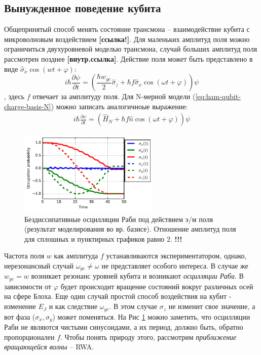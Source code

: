\documentclass[12pt, twoside]{report}
\numberwithin{equation}{section}
\numberwithin{figure}{section}
\begin{document}
\subsection{Вынужденное поведение кубита}
Общепринятый способ менять состояние трансмона -- взаимодействие кубита с микроволновым воздействием \textbf{[ссылка!]}. Для маленьких амплитуд поля можно ограничиться двухуровневой моделью трансмона, случай больших амплитуд поля рассмотрен позднее \textbf{[внутр.ссылка]}. Действие поля может быть представлено в виде $\hat{\sigma}_x \cos (w t + \varphi)$:
\begin{equation}
i \hbar \frac{\partial \psi}{\partial t} =  \left( \frac{\hbar w_{ge}}{2} \hat{\sigma}_z +\hbar f \hat{\sigma}_x \cos \left(\omega t + \varphi\right) \right) \psi
\label{eq:ham-qubit-2d-field}
\end{equation}
, здесь $f$ отвечает за амплитуду поля. Для N-мерной модели (\ref{eq:ham-qubit-charge-basis-N}) можно записать аналогичноые выражение:
\begin{gather}
i \hbar \frac{\partial \psi}{\partial t} = \left( \hat{H}_N + \hbar f \hat{n} \cos \left(\omega t + \varphi \right) \right) \psi
\label{eq:ham-qubit-Nd-field}
\end{gather}
\begin{figure}
\includegraphics[width=0.6\textwidth ]{Pictures2/simple-pulse-2f}
\caption{Бездиссипативные осцилляции Раби под действием э/м поля (результат моделирования во вр. базисе). Отношение амплитуд поля для сплошных и пунктирных графиков равно $2$. \textbf{!!!}}
\label{fig:simple-pulse-2f}
\end{figure}
Частота поля $w$ как амплитуда $f$ устанавливаются экспериментатором, однако, нерезонансный случай $\omega_{ge} \neq \omega$ не представляет особого интереса. В случае же $w_{ge} = w$ возникает резонанс уровней кубита и возникают \textit{осцилляции Раби}. В зависимости от $\varphi$ будет происходит вращение состояний вокруг различных осей на сфере Блоха.
Еще один случай простой способ воздействия на кубит - изменение $E_J$ и как следствие $\omega_{ge}$. В этом случае $\sigma_z$ не изменит свое значение, а вот фаза ($\sigma_x, \sigma_y$) может поменяться. На Рис \ref{fig:simple-pulse-2f} можно заметить, что осцилляции Раби не являются чистыми синусоидами, а их период, должно быть, обратно пропорционален $f$. Чтобы понять природу этого, рассмотрим \textit{приближение вращающейся волны} -- RWA.
\end{document}
